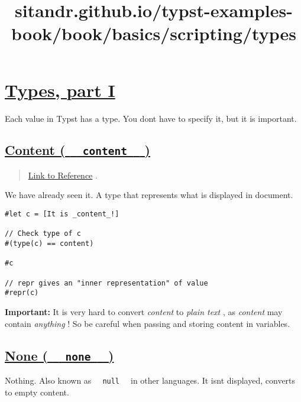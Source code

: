 \title{sitandr.github.io/typst-examples-book/book/basics/scripting/types}

\section{\texorpdfstring{\hyperref[types-part-i]{Types, part
I}}{Types, part I}}\label{types-part-i}

Each value in Typst has a type. You don\textquotesingle t have to
specify it, but it is important.

\subsection{\texorpdfstring{\hyperref[content-content]{Content (
\texttt{\ }{\texttt{\ content\ }}\texttt{\ }
)}}{Content (   content   )}}\label{content-content}

\begin{quote}
\href{https://typst.app/docs/reference/foundations/content/}{Link to
Reference} .
\end{quote}

We have already seen it. A type that represents what is displayed in
document.

\begin{verbatim}
#let c = [It is _content_!]

// Check type of c
#(type(c) == content)

#c

// repr gives an "inner representation" of value
#repr(c)
\end{verbatim}

\pandocbounded{}

\textbf{Important:} It is very hard to convert \emph{content} to
\emph{plain text} , as \emph{content} may contain \emph{anything} ! So
be careful when passing and storing content in variables.

\subsection{\texorpdfstring{\hyperref[none-none]{None (
\texttt{\ }{\texttt{\ none\ }}\texttt{\ }
)}}{None (   none   )}}\label{none-none}

Nothing. Also known as \texttt{\ }{\texttt{\ null\ }}\texttt{\ } in
other languages. It isn\textquotesingle t displayed, converts to empty
content.

